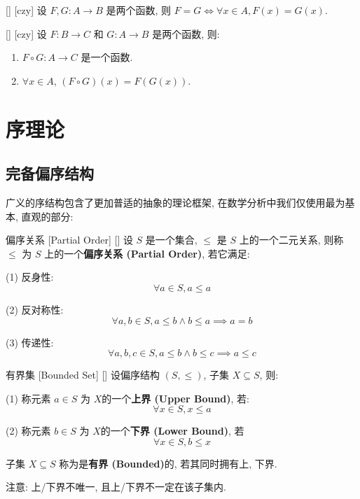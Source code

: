 \documentclass[UTF8]{ctexart}
\begin{document}
        \begin{ppt}
            [UUID]
            {}
            []
            [czy]
            设 \( F, G: A \rightarrow B \) 是两个函数, 则 \( F = G \iff\forall x \in A, F(x) = G(x) \).
        \end{ppt}

        \begin{thm}
            [UUID]
            {}
            []
            [czy]
            设 \( F: B \rightarrow C \) 和 \( G: A \rightarrow B \) 是两个函数, 则: 
            \begin{enumerate}
                \item \( F \circ G: A \rightarrow C \) 是一个函数. 
                \item \(\forall x \in A \), \( (F \circ G)(x) = F(G(x)) \). 
            \end{enumerate}
        \end{thm}

\section{序理论}
    
    \subsection{完备偏序结构}

        广义的序结构包含了更加普适的抽象的理论框架, 在数学分析中我们仅使用最为基本, 直观的部分: 
        
        \begin{dfn}
            []
            {偏序关系}
            [Partial Order]
            []
            设 \(S\) 是一个集合, \(\leq\) 是 \(S\) 上的一个二元关系, 则称 \(\leq\) 为 \(S\) 上的一个\textbf{偏序关系 (Partial Order)}, 若它满足: 

            (1) 反身性:
            \[\forall a\in S, a\leq a\]

            (2) 反对称性:
            \[\forall a,b\in S, a\leq b\land b\leq a \implies a=b\]

            (3) 传递性:
            \[\forall a,b,c\in S, a\leq b\land b\leq c \implies a\leq c\]
        \end{dfn}
    
        \begin{dfn}
            []
            {有界集}
            [Bounded Set]
            []
            设偏序结构 \((S,\leq)\), 子集 \(X\subseteq S\), 则: 
            
            (1) 称元素 \(a\in S\) 为 \(X\)的一个\textbf{上界 (Upper Bound)}, 若: 
            \[\forall x\in S, x\leq a\]
            
            (2) 称元素 \(b\in S\) 为 \(X\)的一个\textbf{下界 (Lower Bound)}, 若
            \[\forall x\in S, b\leq x\]
            
            子集 \(X\subseteq S\) 称为是\textbf{有界 (Bounded)}的, 若其同时拥有上, 下界. 

            注意: 上/下界不唯一, 且上/下界不一定在该子集内. 
        \end{dfn}
        
\end{document}
